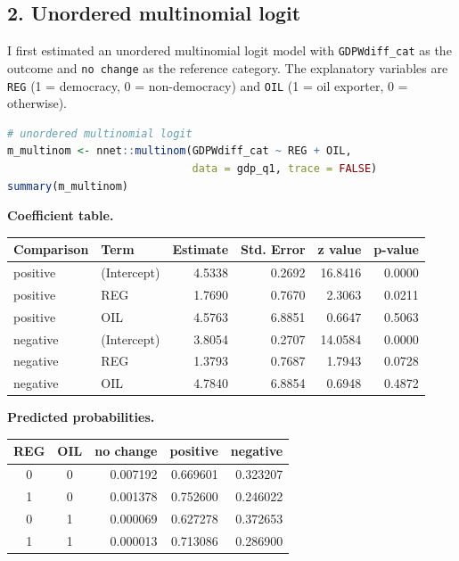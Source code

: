 \documentclass[12pt,letterpaper]{article}
\begin{document}
\subsection*{2. Unordered multinomial logit}
I first estimated an unordered multinomial logit model with \texttt{GDPWdiff\_cat} as the outcome and \texttt{no change} as the reference category. The explanatory variables are \texttt{REG} (1 = democracy, 0 = non-democracy) and \texttt{OIL} (1 = oil exporter, 0 = otherwise).

\begin{lstlisting}[language=R]
# unordered multinomial logit
m_multinom <- nnet::multinom(GDPWdiff_cat ~ REG + OIL,
                             data = gdp_q1, trace = FALSE)
summary(m_multinom)
\end{lstlisting}

\noindent\textbf{Coefficient table.}

\begin{center}
\begin{tabular}{llrrrr}
\toprule
Comparison & Term & Estimate & Std. Error & z value & p-value \\
\midrule
positive & (Intercept) & 4.5338 & 0.2692 & 16.8416 & 0.0000 \\
positive & REG         & 1.7690 & 0.7670 &  2.3063 & 0.0211 \\
positive & OIL         & 4.5763 & 6.8851 &  0.6647 & 0.5063 \\
negative & (Intercept) & 3.8054 & 0.2707 & 14.0584 & 0.0000 \\
negative & REG         & 1.3793 & 0.7687 &  1.7943 & 0.0728 \\
negative & OIL         & 4.7840 & 6.8854 &  0.6948 & 0.4872 \\
\bottomrule
\end{tabular}
\end{center}

\noindent\textbf{Predicted probabilities.}

\begin{center}
\begin{tabular}{ccrrr}
\toprule
REG & OIL & no change & positive & negative \\
\midrule
0 & 0 & 0.007192 & 0.669601 & 0.323207 \\
1 & 0 & 0.001378 & 0.752600 & 0.246022 \\
0 & 1 & 0.000069 & 0.627278 & 0.372653 \\
1 & 1 & 0.000013 & 0.713086 & 0.286900 \\
\bottomrule
\end{tabular}
\end{center}
\end{document}
